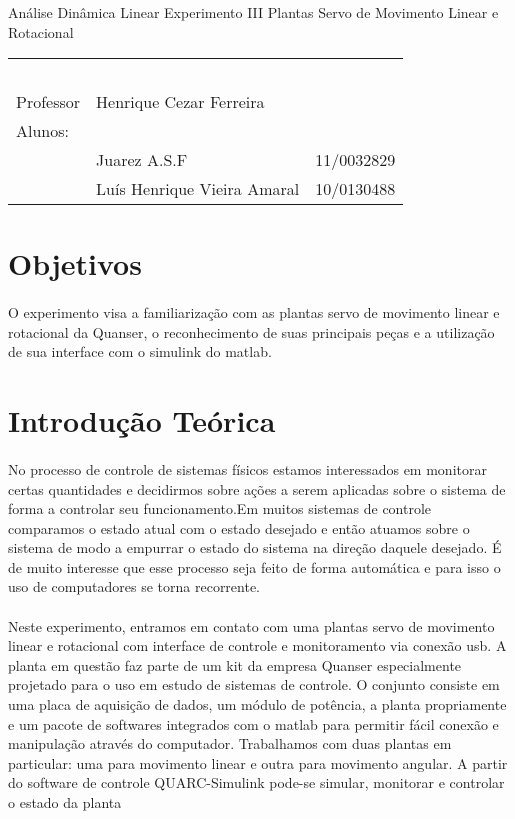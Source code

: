 \documentclass[a4paper,11pt]{article}
\begin{document}
\MakeMyTitlePage
{Análise Dinâmica Linear}
{Experimento III}
{Plantas Servo de Movimento Linear e Rotacional}
{%
		\begin{tabular}{llr} \
		& & \\[0.05cm]		
		Professor & Henrique Cezar Ferreira & \\
		
		Alunos:& & \\
		& Juarez A.S.F 												& 11/0032829\\
		& Luís Henrique Vieira Amaral						&	10/0130488 	
			\end{tabular}
}

\section{Objetivos}
\paragraph{} O experimento visa a familiarização com as plantas servo de movimento linear e rotacional da
Quanser, o reconhecimento de suas principais peças e a utilização de sua interface com o simulink do matlab.
\section{Introdução Teórica}
\paragraph{}No processo de controle de sistemas físicos estamos interessados em monitorar certas quantidades
e decidirmos sobre ações a serem aplicadas sobre o sistema de forma a controlar seu funcionamento.Em muitos
sistemas de controle comparamos o estado atual com o estado desejado e então atuamos sobre o sistema de modo
a empurrar o estado do sistema na direção  daquele desejado. É de muito interesse que esse processo
 seja feito de forma automática e
para isso o uso de computadores se torna recorrente. 
    
\paragraph{} Neste experimento, entramos em contato com uma plantas servo de movimento linear e rotacional com interface de controle e monitoramento via conexão usb. A planta em questão faz parte de um kit da empresa Quanser especialmente
projetado para o uso em estudo de sistemas de controle. O conjunto consiste em uma placa de aquisição de dados,
um módulo de potência, a planta propriamente e um pacote de softwares integrados com o matlab para permitir
fácil conexão e manipulação através do computador. Trabalhamos com duas plantas em particular: uma para 
movimento linear e outra para movimento angular. A partir do software de controle QUARC-Simulink pode-se 
simular, monitorar e controlar o estado da planta
  
\end{document}
